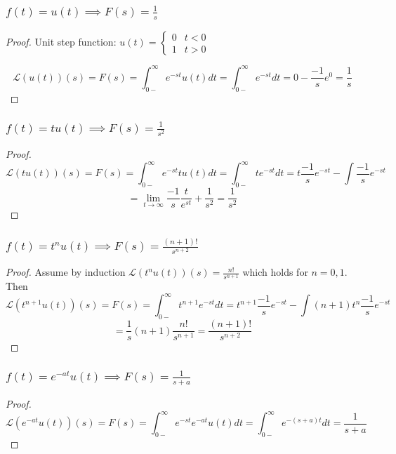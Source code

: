 \documentclass[11pt]{article}
\begin{document}
\subsubsection{$f(t) = u(t) \implies F(s) = \frac{1}{s}$}
\begin{proof}
Unit step function: $u(t) = \begin{cases}
	0 & t < 0 \\ 1 & t > 0
\end{cases}$

\[\mathcal{L}(u(t))(s) = F(s) = \int_{0-}^{\infty} e^{-st}u(t)  dt  = \int_{0-}^{\infty} e^{-st} dt = 0-\frac{-1}{s}e^0 = \frac{1}{s}\]
\end{proof}


\subsubsection{$f(t) = tu(t) \implies F(s) = \frac{1}{s^2}$}
\begin{proof}


\[\mathcal{L}(tu(t))(s) = F(s) = \int_{0-}^{\infty} e^{-st}tu(t)  dt  = \int_{0-}^{\infty} te^{-st} dt = t\frac{-1}{s}e^{-st} - \int \frac{-1}{s} e^{-st}\]
\[= \lim_{t \to \infty} \frac{-1}{s} \frac{t}{e^{st}} + \frac{1}{s^2} = \frac{1}{s^2}\]

	
\end{proof}

\subsubsection{$f(t) = t^n u(t) \implies F(s)  = \frac{(n + 1)!}{s^{n + 2}} $}
\begin{proof}

Assume by induction $\mathcal{L}(t^nu(t))(s) = \frac{n!}{s^{n + 1}}$ which holds for $n =  0, 1$. Then 
\[\mathcal{L}(t^{n + 1}u(t))(s) = F(s) =  \int_{0-}^{\infty} t^{n + 1}e^{-st} dt  = t^{n + 1} \frac{-1}{s}e^{- st} - \int (n + 1) t^n \frac{-1}{s} e^{-st}\]
\[= \frac{1}{s} (n + 1) \frac{n!}{s^{n + 1}} = \frac{(n + 1)!}{s^{n + 2}} \]
	
\end{proof}
\subsubsection{$f(t) = e^{-at}u(t) \implies F(s)  = \frac{1}{s + a}$}
\begin{proof}

\[\mathcal{L}(e^{-at}u(t))(s) = F(s) = \int_{0-}^{\infty} e^{-st}e^{-at}u(t)  dt =  \int_{0-}^{\infty} e^{-(s + a)t} dt = \frac{1}{s + a}\]
	
\end{proof}
\end{document}
